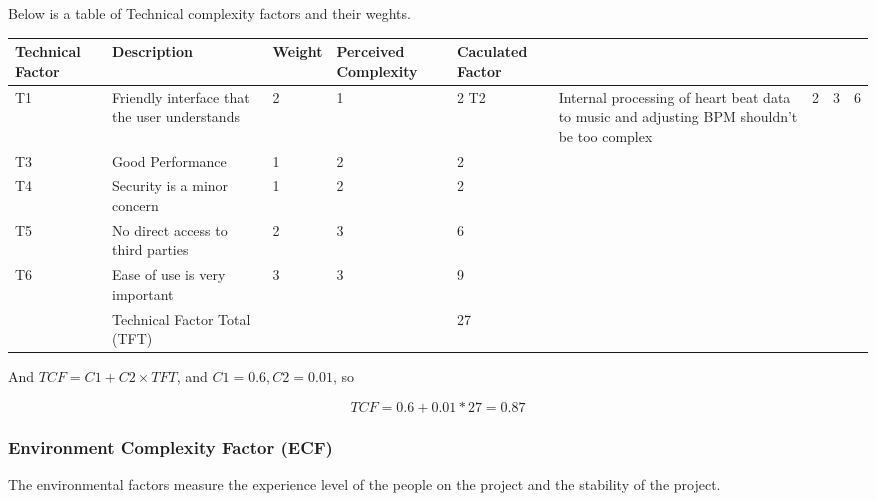 \documentclass[letterpaper,english, 12pt]{scrreprt}
\begin{document}
Below is a table of Technical complexity factors and their weghts.

\begin{center}
        \begin{tabular}{|C{2cm}|C{5cm}|C{1cm}|C{1cm}|C{1cm}|}
                \hline
                        Technical Factor & Description & Weight & Perceived Complexity & Caculated Factor \\
                \hline
                        T1 & Friendly interface that the user understands & 2 & 1 & 2
                \hline
                        T2 & Internal processing of heart beat data to music and adjusting BPM shouldn't be too complex & 2 & 3 & 6\\
                \hline
                        T3 & Good Performance & 1 & 2 & 2 \\
                \hline
                        T4 & Security is a minor concern & 1 & 2 & 2 \\
                \hline
                        T5 & No direct access to third parties & 2 & 3 & 6 \\
                \hline
                        T6 & Ease of use is very important & 3 & 3 & 9\\
                \hline   
                        & Technical Factor Total (TFT) & & & 27 \\
                \hline
        \end{tabular}
\end{center}

And $TCF = C1 + C2 \times TFT$, and $C1 = 0.6, C2 = 0.01$, so

\begin{equation}
TCF = 0.6 + 0.01*27 = 0.87
\end{equation}

\subsubsection{Environment Complexity Factor (ECF)}

The environmental factors measure the experience level of the people on the project and the stability of the project. 
\end{document}

